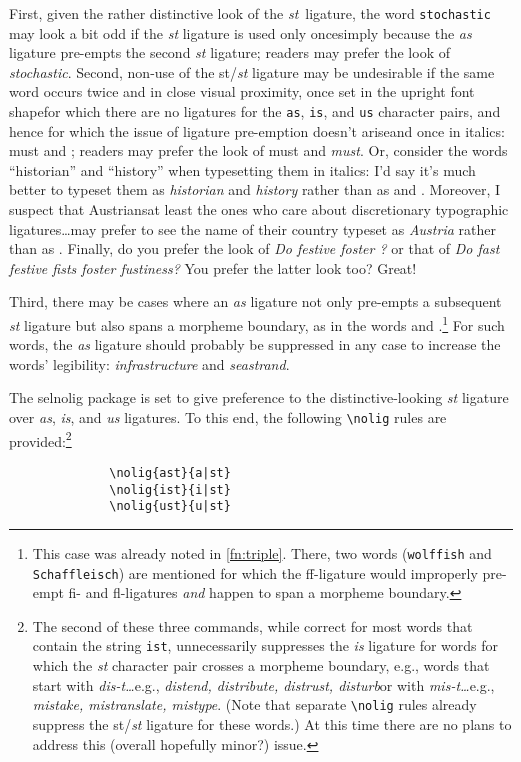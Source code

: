 \documentclass[11pt]{article}
\newcommand{\pkg}[1]{\textsf{#1}}
\newcommand{\opt}[1]{\texttt{#1}}
\newcommand{\cmmd}[1]{\texttt{\textbackslash #1}}
\begin{document}
First, given the rather distinctive look of the \emph{st}~ligature, the word \opt{stochastic} may look a bit odd if the \emph{st} ligature is used only once\textemdash\emph{}\textemdash simply because the \emph{as} ligature pre-empts the second \emph{st} ligature; readers may prefer the look of \emph{stochastic}. Second, non-use of the st/\emph{st} ligature may be undesirable if the same word occurs twice and in close visual proximity, once set in the upright font shape\textemdash for which there are no ligatures for the \opt{as}, \opt{is}, and \opt{us} character pairs, and hence for which the issue of ligature pre-emption doesn't arise\textemdash and once in italics: must and \emph{}; readers may prefer the look of must and \emph{must}. Or, consider the words \enquote{historian} and \enquote{history} when typesetting them in italics: I'd say it's much better to typeset them as \emph{historian} and \emph{history} rather than as \emph{} and \emph{}. Moreover, I suspect that Austrians\textemdash at least the ones who care about discretionary typographic ligatures\dots\textemdash may prefer to see the name of their country typeset as \emph{Austria} rather than as \emph{}. Finally, do you prefer the look of \emph{Do  festive  foster ?} or that of \emph{Do fast festive fists foster fustiness?} You prefer the latter look too? Great! 

Third, there may be cases where an \emph{as} ligature not only pre-empts a subsequent \emph{st} ligature but also spans a morpheme boundary, as in the words \emph{} and \emph{}.\footnote{This case was already noted in \cref{fn:triple}. There, two words (\opt{wolffish} and \opt{Schaffleisch}) are mentioned for which the ff-ligature would improperly pre-empt fi- and fl-ligatures \emph{and} happen to span a morpheme boundary.} For such words, the \emph{as} ligature should probably be suppressed in any case to increase the words' legibility: \emph{infrastructure} and \emph{seastrand}.

The \pkg{selnolig} package is set to give preference to the distinctive-looking \emph{st} ligature over \emph{as}, \emph{is}, and \emph{us} ligatures. To this end, the following \cmmd{nolig} rules are provided:\footnote{The second of these three commands, while correct for most words that contain the string \opt{ist}, unnecessarily suppresses the \emph{is} ligature for words for which the \emph{st} character pair crosses a morpheme boundary, e.g., words that start with \emph{dis-t\ldots}\textemdash e.g., \emph{distend, distribute, distrust, disturb}\textemdash or with \emph{mis-t\ldots}\textemdash e.g., \emph{mistake, mistranslate, mistype}. (Note that separate \cmmd{nolig} rules already suppress the st/\emph{st} ligature for these words.) At this time there are no plans to address this (overall hopefully minor?) issue.}
\begin{Verbatim}
              \nolig{ast}{a|st}
              \nolig{ist}{i|st}
              \nolig{ust}{u|st}
\end{Verbatim}
\end{document}
